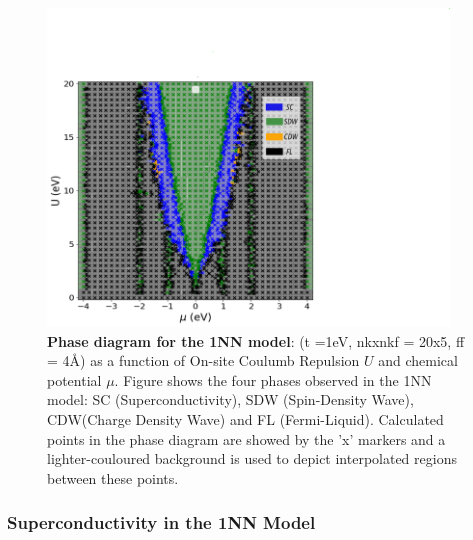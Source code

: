 \documentclass[12pt]{article}
\begin{document}
\begin{figure}[htbp]  %
    \centering
    \includegraphics[width=0.95\textwidth]{1NNphased.png}  %
    \caption{\textbf{Phase diagram for the 1NN model}:  (t =1eV, nkxnkf = 20x5, ff = 4\AA) as a function of On-site Coulumb Repulsion $U$ and chemical potential $\mu$. 
    Figure shows the four phases observed in the 1NN model: SC (Superconductivity), SDW (Spin-Density Wave), CDW(Charge Density Wave) and FL (Fermi-Liquid).
    Calculated points in the phase diagram are showed by the 'x' markers and a lighter-couloured background is used to depict interpolated regions between these points. }
    \label{fig:1NNpd}
\end{figure}




\subsubsection{Superconductivity in the 1NN Model}
\end{document}
